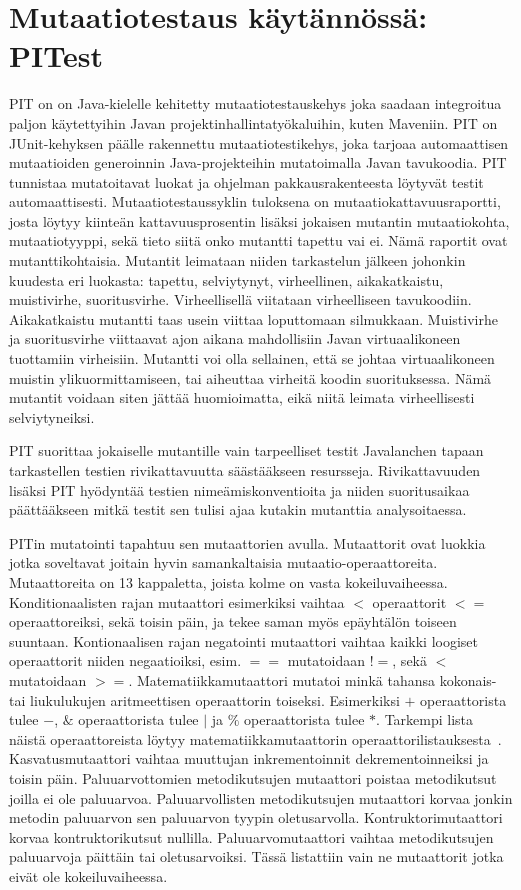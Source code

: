 \documentclass{tktltiki}
\begin{document}
\section{Mutaatiotestaus käytännössä: PITest}
PIT on on Java-kielelle kehitetty mutaatiotestauskehys joka saadaan integroitua paljon käytettyihin Javan projektinhallintatyökaluihin, kuten Maveniin. PIT on JUnit-kehyksen päälle rakennettu mutaatiotestikehys, joka tarjoaa automaattisen mutaatioiden generoinnin Java-projekteihin mutatoimalla Javan tavukoodia. PIT tunnistaa mutatoitavat luokat ja ohjelman pakkausrakenteesta löytyvät testit automaattisesti. Mutaatiotestaussyklin tuloksena on mutaatiokattavuusraportti, josta löytyy kiinteän kattavuusprosentin lisäksi jokaisen mutantin mutaatiokohta, mutaatiotyyppi, sekä tieto siitä onko mutantti tapettu vai ei. Nämä raportit ovat mutanttikohtaisia. Mutantit leimataan niiden tarkastelun jälkeen johonkin kuudesta eri luokasta: tapettu, selviytynyt, virheellinen, aikakatkaistu, muistivirhe, suoritusvirhe. Virheellisellä viitataan virheelliseen tavukoodiin. Aikakatkaistu mutantti taas usein viittaa loputtomaan silmukkaan. Muistivirhe ja suoritusvirhe viittaavat ajon aikana mahdollisiin Javan virtuaalikoneen tuottamiin virheisiin. Mutantti voi olla sellainen, että se johtaa virtuaalikoneen muistin ylikuormittamiseen, tai aiheuttaa virheitä koodin suorituksessa. Nämä mutantit voidaan siten jättää huomioimatta, eikä niitä leimata virheellisesti selviytyneiksi.

PIT suorittaa jokaiselle mutantille vain tarpeelliset testit Javalanchen tapaan tarkastellen testien rivikattavuutta säästääkseen resursseja. Rivikattavuuden lisäksi PIT hyödyntää testien nimeämiskonventioita ja niiden suoritusaikaa päättääkseen mitkä testit sen tulisi ajaa kutakin mutanttia analysoitaessa.

PITin mutatointi tapahtuu sen mutaattorien avulla. Mutaattorit ovat luokkia jotka soveltavat joitain hyvin samankaltaisia mutaatio-operaattoreita. Mutaattoreita on 13 kappaletta, joista kolme on vasta kokeiluvaiheessa. Konditionaalisten rajan mutaattori esimerkiksi vaihtaa $<$ operaattorit $<=$ operaattoreiksi, sekä toisin päin, ja tekee saman myös epäyhtälön toiseen suuntaan. Kontionaalisen rajan negatointi mutaattori vaihtaa kaikki loogiset operaattorit niiden negaatioiksi, esim. $==$ mutatoidaan $!=$, sekä $<$ mutatoidaan $>=$. Matematiikkamutaattori mutatoi minkä tahansa kokonais- tai liukulukujen aritmeettisen operaattorin toiseksi. Esimerkiksi $+$ operaattorista tulee $-$, $\&$ operaattorista tulee $|$ ja $\%$ operaattorista tulee $*$. Tarkempi lista näistä operaattoreista löytyy matematiikkamutaattorin operaattorilistauksesta~\cite{PITMathMutations}. Kasvatusmutaattori vaihtaa muuttujan inkrementoinnit dekrementoinneiksi ja toisin päin. Paluuarvottomien metodikutsujen mutaattori poistaa metodikutsut joilla ei ole paluuarvoa. Paluuarvollisten metodikutsujen mutaattori korvaa jonkin metodin paluuarvon sen paluuarvon tyypin oletusarvolla. Kontruktorimutaattori korvaa kontruktorikutsut nullilla. Paluuarvomutaattori vaihtaa metodikutsujen paluuarvoja päittäin tai oletusarvoiksi. Tässä listattiin vain ne mutaattorit jotka eivät ole kokeiluvaiheessa.
\end{document}
